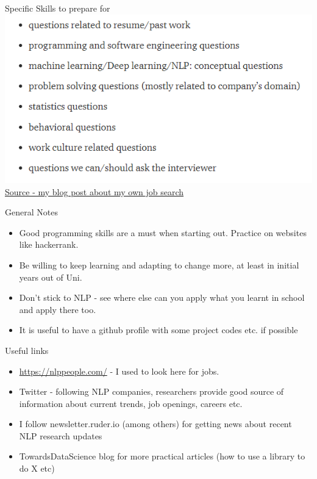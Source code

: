 \documentclass{beamer}
\begin{document}
\begin{frame}{Specific Skills to prepare for}
\includegraphics[width=\textwidth]{figures/interviews.PNG}
\href{https://towardsdatascience.com/preparing-for-in-person-data-science-interviews-some-thoughts-5e2677ee30d9}{Source - my blog post about my own job search}
\end{frame}

\begin{frame}{General Notes}
    \begin{itemize}
        \item Good programming skills are a must when starting out. Practice on websites like hackerrank. 
        \item Be willing to keep learning and adapting to change more, at least in initial years out of Uni. 
        \item Don't stick to NLP - see where else can you apply what you learnt in school and apply there too. 
        \item It is useful to have a github profile with some project codes etc. if possible
    \end{itemize}
\end{frame}

\begin{frame}{Useful links}
    \begin{itemize}
        \item \url{https://nlppeople.com/} - I used to look here for jobs.
        \item Twitter - following NLP companies, researchers provide good source of information about current trends, job openings, careers etc.
        \item I follow newsletter.ruder.io (among others) for getting news about recent NLP research updates
        \item TowardsDataScience blog for more practical articles (how to use a library to do X etc)
    \end{itemize}
\end{frame}
\end{document}
